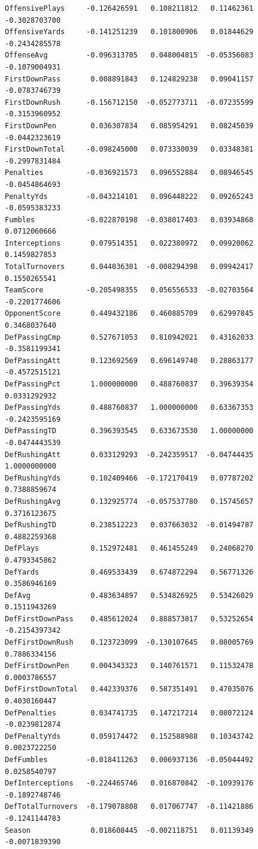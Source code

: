 \documentclass[
  letterpaper,
  DIV=11,
  numbers=noendperiod]{scrreprt}
\begin{document}
\begin{verbatim}
OffensivePlays     -0.126426591   0.108211812   0.11462361 -0.3028703700
OffensiveYards     -0.141251239   0.101800906   0.01844629 -0.2434285578
OffenseAvg         -0.096313705   0.048004815  -0.05356083 -0.1079004931
FirstDownPass       0.008891843   0.124829238   0.09041157 -0.0783746739
FirstDownRush      -0.156712150  -0.052773711  -0.07235599 -0.3153960952
FirstDownPen        0.036307834   0.085954291   0.08245039 -0.0442323619
FirstDownTotal     -0.098245000   0.073330039   0.03348381 -0.2997831484
Penalties          -0.036921573   0.096552884   0.08946545 -0.0454864693
PenaltyYds         -0.043214101   0.096448222   0.09265243 -0.0595383233
Fumbles            -0.022870198  -0.038017403   0.03934868  0.0712060666
Interceptions       0.079514351   0.022380972   0.09920062  0.1459827853
TotalTurnovers      0.044036301  -0.008294398   0.09942417  0.1550265541
TeamScore          -0.205498355   0.056556533  -0.02703564 -0.2201774606
OpponentScore       0.449432186   0.460885709   0.62997845  0.3468037640
DefPassingCmp       0.527671053   0.810942021   0.43162033 -0.3581199341
DefPassingAtt       0.123692569   0.696149740   0.28863177 -0.4572515121
DefPassingPct       1.000000000   0.488760837   0.39639354  0.0331292932
DefPassingYds       0.488760837   1.000000000   0.63367353 -0.2423595169
DefPassingTD        0.396393545   0.633673530   1.00000000 -0.0474443539
DefRushingAtt       0.033129293  -0.242359517  -0.04744435  1.0000000000
DefRushingYds       0.102409466  -0.172170419   0.07787202  0.7388859674
DefRushingAvg       0.132925774  -0.057537780   0.15745657  0.3716123675
DefRushingTD        0.238512223   0.037663032  -0.01494787  0.4882259368
DefPlays            0.152972481   0.461455249   0.24068270  0.4793345862
DefYards            0.469533439   0.674872294   0.56771326  0.3586946169
DefAvg              0.483634897   0.534826925   0.53426029  0.1511943269
DefFirstDownPass    0.485612024   0.888573817   0.53252654 -0.2154397342
DefFirstDownRush    0.123723099  -0.130107645   0.08005769  0.7886334156
DefFirstDownPen     0.004343323   0.140761571   0.11532478  0.0003786557
DefFirstDownTotal   0.442339376   0.587351491   0.47035076  0.4030160447
DefPenalties        0.034741735   0.147217214   0.08072124 -0.0239812874
DefPenaltyYds       0.059174472   0.152588988   0.10343742  0.0023722250
DefFumbles         -0.018411263   0.006937136  -0.05044492  0.0258540797
DefInterceptions   -0.224465746   0.016870842  -0.10939176 -0.1892748746
DefTotalTurnovers  -0.179078808   0.017067747  -0.11421886 -0.1241144783
Season              0.018608445  -0.002118751   0.01139349 -0.0071839390

\end{verbatim}
\end{document}
